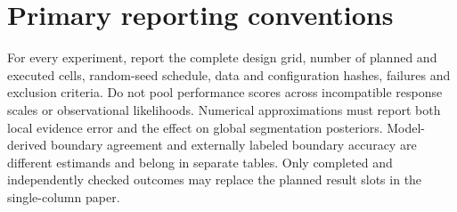 \section{Primary reporting conventions}
For every experiment, report the complete design grid, number of planned and executed cells,
random-seed schedule, data and configuration hashes, failures and exclusion criteria.
Do not pool performance scores across incompatible response scales or observational
likelihoods. Numerical approximations must report both local evidence error and the effect on
global segmentation posteriors. Model-derived boundary agreement and externally labeled
boundary accuracy are different estimands and belong in separate tables. Only completed and
independently checked outcomes may replace the planned result slots in the single-column paper.
